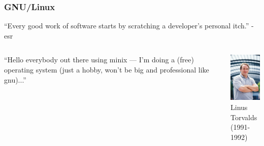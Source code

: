 \documentclass{beamer}
\begin{document}
\begin{frame}
  \frametitle{GNU/Linux}
  \begin{center}
    \begin{minipage}{0.8\textwidth}
      \begin{block}{}
        \begin{center}
          “Every good work of software starts by scratching a developer's personal itch.” - esr
        \end{center}
      \end{block}
    \end{minipage}
  \end{center}
  \begin{columns}
    \column{7cm}
      ``Hello everybody out there using minix — I’m doing a (free) operating
      system (just a hobby, won’t be big and professional like gnu)...''
    \column{3cm}
    \begin{center}
      \includegraphics[width=3cm]{linus.jpg}\\
      Linus Torvalds\\
      (1991-1992)
    \end{center}
  \end{columns}
\end{frame}
\end{document}
